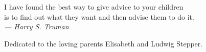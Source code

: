 \thispagestyle{empty}
{}

\vspace*{3cm}

\begin{center}

%    
%    
    I have found the best way to give advice to your children \\
     is to find out what they want and then advise them to do it. \\ \smallskip
     \emph{--- Harry S. Truman}

      
\end{center}

\bigskip
\bigskip

\begin{center}
    Dedicated to the loving parents Elisabeth and Ludwig Stepper. 
\end{center}
